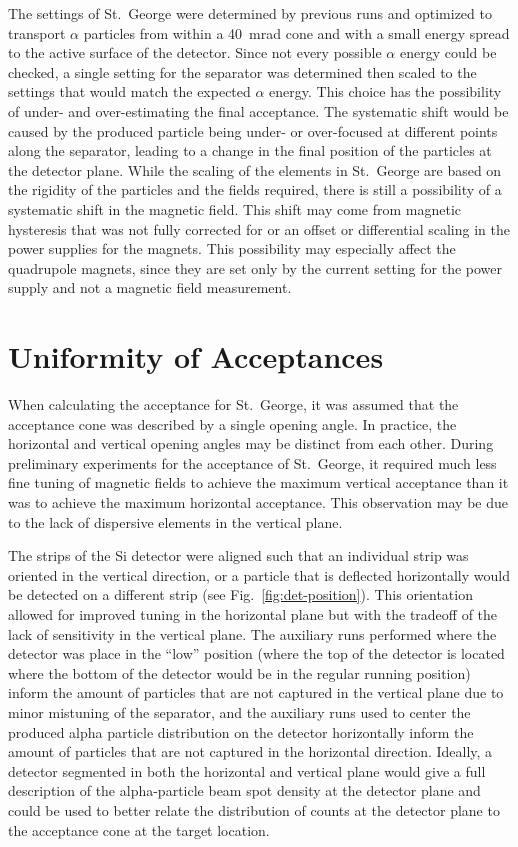 The settings of St.\ George were determined by previous runs and
optimized to transport $\alpha$ particles from within a 40~mrad cone and
with a small energy spread to the active surface of the detector. Since
not every possible $\alpha$ energy could be checked, a single setting
for the separator was determined then scaled to the settings that would
match the expected $\alpha$ energy. This choice has the possibility of
under- and over-estimating the final acceptance. The systematic shift
would be caused by the produced particle being under- or over-focused at
different points along the separator, leading to a change in the final
position of the particles at the detector plane. While the scaling of
the elements in St.\ George are based on the rigidity of the particles
and the fields required, there is still a possibility of a systematic
shift in the magnetic field. This shift may come from magnetic
hysteresis that was not fully corrected for or an offset or differential
scaling in the power supplies for the magnets. This possibility may
especially affect the quadrupole magnets, since they are set only by the
current setting for the power supply and not a magnetic field
measurement.


\section{Uniformity of Acceptances}
\label{sec:uniformity-of-acceptances}

When calculating the acceptance for St.\ George, it was assumed that the
acceptance cone was described by a single opening angle. In practice,
the horizontal and vertical opening angles may be distinct from each
other. During preliminary experiments for the acceptance of St.\ George,
it required much less fine tuning of magnetic fields to achieve the
maximum vertical acceptance than it was to achieve the maximum
horizontal acceptance. This observation may be due to the lack of
dispersive elements in the vertical plane.

The strips of the Si detector were aligned such that an individual strip
was oriented in the vertical direction, or a particle that is deflected
horizontally would be detected on a different strip (see
Fig.~\ref{fig:det-position}). This orientation allowed for
improved tuning in the horizontal plane but with the tradeoff of the
lack of sensitivity in the vertical plane. The auxiliary runs performed
where the detector was place in the ``low'' position (where the top of
the detector is located where the bottom of the detector would be in the
regular running position) inform the amount of particles that are not
captured in the vertical plane due to minor mistuning of the separator,
and the auxiliary runs used to center the produced alpha particle
distribution on the detector horizontally inform the amount of particles
that are not captured in the horizontal direction. Ideally, a detector
segmented in both the horizontal and vertical plane would give a full
description of the alpha-particle beam spot density at the detector
plane and could be used to better relate the distribution of counts at
the detector plane to the acceptance cone at the target location.

